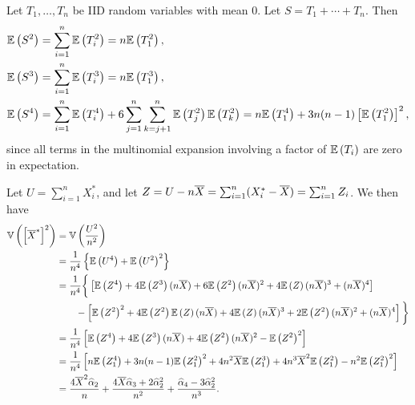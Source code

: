 \begin{ex}
  Let $T_1,\ldots,T_n$ be IID random variables with mean $0$. Let
  $S=T_1+\cdots+T_n$. Then
  \begin{align*}
    \mathbb{E}\left(S^2\right)
     & =\sum_{i=1}^n \mathbb{E}\left(T_i^2\right)
    =n\mathbb{E}\left(T_1^2\right),                                                                          \\
    \mathbb{E}\left(S^3\right)
     & =\sum_{i=1}^n \mathbb{E}\left(T_i^3\right)
    =n\mathbb{E}\left(T_1^3\right),                                                                          \\
    \mathbb{E}\left(S^4\right)
     & =\sum_{i=1}^n \mathbb{E}\left(T_i^4\right)+6\sum_{j=1}^n\sum_{\substack{k = j+1}}^n\mathbb{E}\left(T_j^2\right)\mathbb{E}\left(T_k^2\right)
    =n\mathbb{E}\left(T_1^4\right)+3n(n-1)\left[\mathbb{E}\left(T_1^2\right)\right]^2,
  \end{align*}
  since all terms in the multinomial expansion involving a factor of $\mathbb{E}\left(T_i\right)$
  are zero in expectation.

  Let $U=\sum_{i=1}^n X_i^*$, and let
  $Z=U-n\overline{X}=\sum_{i=1}^n(X_i^*-\overline{X})=\sum_{i=1}^n Z_i$. We then have
  \begin{align*}
    \mathbb{V}\left(\left[\overline{X}^*\right]^2\right)
     & =\mathbb{V}\left(\frac{U^2}{n^2}\right) \\
     & =\frac{1}{n^4}\left\{
    \mathbb{E}\left(U^4\right)
    +\mathbb{E}\left(U^2\right)^2
    \right\}                  \\
     & =\frac{1}{n^4}\bigg\{
    \left[\mathbb{E}\left(Z^4\right)
      +4\mathbb{E}\left(Z^3\right)(n\overline{X})
      +6\mathbb{E}\left(Z^2\right)(n\overline{X})^2
      +4\mathbb{E}\left(Z\right)(n\overline{X})^3
      +(n\overline{X})^4
      \right]                 \\
     & \qquad-\left[
      \mathbb{E}\left(Z^2\right)^2
      +4\mathbb{E}\left(Z^2\right)\mathbb{E}\left(Z\right)(n\overline{X})
      +4\mathbb{E}\left(Z\right)(n\overline{X})^3
      +2\mathbb{E}\left(Z^2\right)(n\overline{X})^2
      +(n\overline{X})^4
      \right]\bigg\}          \\
     & =\frac{1}{n^4}
    \left[\mathbb{E}\left(Z^4\right)
      +4\mathbb{E}\left(Z^3\right)(n\overline{X})
      +4\mathbb{E}\left(Z^2\right)(n\overline{X})^2
      -\mathbb{E}\left(Z^2\right)^2
      \right]                 \\
     & =\frac{1}{n^4}
    \left[
      n\mathbb{E}\left(Z_1^4\right)+3n(n-1)\mathbb{E}\left(Z_1^2\right)^2
      +4n^2\overline{X}\mathbb{E}\left(Z_1^3\right)
      +4n^3\overline{X}^2\mathbb{E}\left(Z_1^2\right)
      -n^2\mathbb{E}\left(Z_1^2\right)^2
      \right]                 \\
     & =
    \frac{4\overline{X}^2\widehat{\alpha}_2}{n}
    +\frac{4\overline{X}\widehat{\alpha}_3+2\widehat{\alpha}_2^2}{n^2}
    +\frac{\widehat{\alpha}_4-3\widehat{\alpha}_2^2}{n^3}.
  \end{align*}
\end{ex}